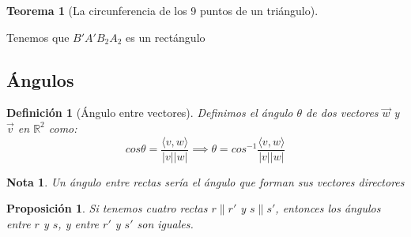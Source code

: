 \documentclass[11pt, a4paper]{article}
\makeatletter
\newif\IfInSansMode
\let\oldsf\sffamily
\renewcommand*{\sffamily}{\oldsf\mathversion{sans}\InSansModetrue}
\let\oldnorm\normalfont
\renewcommand*{\normalfont}{\oldnorm\InSansModefalse\mathversion{normal}}
\renewenvironment{proof}[1][\proofname] {\vspace{-15pt}\par\pushQED{\qed}\normalfont\topsep6\p@\@plus6\p@\relax\trivlist\item[\hskip\labelsep\it#1\@addpunct{.}]\ignorespaces}{\popQED\endtrivlist\@endpefalse}
\newcommand{\R}{\mathbb{R}}
\renewcommand{\vec}{\overrightarrow}
\renewenvironment{proof}[1][\proofname] {\par\pushQED{\qed}\normalfont\topsep6\p@\@plus6\p@\relax\trivlist\item[\hskip\labelsep\itshape\sffamily#1\@addpunct{.}]\ignorespaces}{\popQED\endtrivlist\@endpefalse}
\theoremstyle{theorem-style}
\newtheorem{nth}{Teorema}[section]
\newtheorem{nprop}{Proposición}[section]
\theoremstyle{definition-style}
\newtheorem{ndef}{Definición}[section]
\theoremstyle{remark-style}
\newtheorem*{nota}{Nota}
\theoremstyle{example-style}
\makeatother
\begin{document}
\begin{nth}[La circunferencia de los 9 puntos de un triángulo]
\begin{center}

  \end{center}
   
\end{nth}
\begin{proof}
  Tenemos que $B'A'B_2A_2$ es un rectángulo
\end{proof}



\subsection{Ángulos}

\begin{ndef}[Ángulo entre vectores]
  Definimos el ángulo $\theta$ de dos vectores $\vec{w}$ y $\vec{v}$ en $\R^2$ como:
  \[
    cos \theta =  \frac{\langle  v,w \rangle }{|v||w|} \implies \theta = cos^{-1} \frac{\langle  v,w \rangle }{|v||w|}
  \]
\end{ndef} 
\begin{nota}
  Un ángulo entre rectas sería el ángulo que forman sus vectores directores
\end{nota}
\begin{nprop}
  Si tenemos cuatro rectas $r \parallel r'$ y $s \parallel s'$, entonces los ángulos entre $r$ y $s$, y entre $r'$ y $s'$ son iguales.
\end{nprop}
\end{document}
